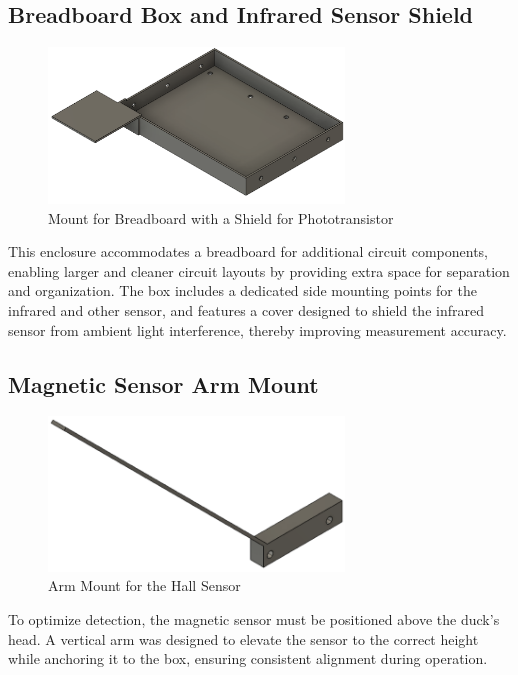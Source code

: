 \subsection*{Breadboard Box and Infrared Sensor Shield}
\begin{figure}[H]
  \centering
  \includegraphics[width=0.7\textwidth]{subpages/images/breadboard_box.png}
  \caption{Mount for Breadboard with a Shield for Phototransistor}
  \label{fig:breadboard_box_shield}
\end{figure}
This enclosure accommodates a breadboard for additional circuit components, enabling larger and cleaner circuit layouts by providing extra space for separation and organization. The box includes a dedicated side mounting points for the infrared and other sensor, and features a cover designed to shield the infrared sensor from ambient light interference, thereby improving measurement accuracy.

\subsection*{Magnetic Sensor Arm Mount}
\begin{figure}[H]
  \centering
  \includegraphics[width=0.7\textwidth]{subpages/images/magnet_arm.png}
  \caption{Arm Mount for the Hall Sensor}
  \label{fig:magnet_arm}
\end{figure}
To optimize detection, the magnetic sensor must be positioned above the duck’s head. A vertical arm was designed to elevate the sensor to the correct height while anchoring it to the box, ensuring consistent alignment during operation.

